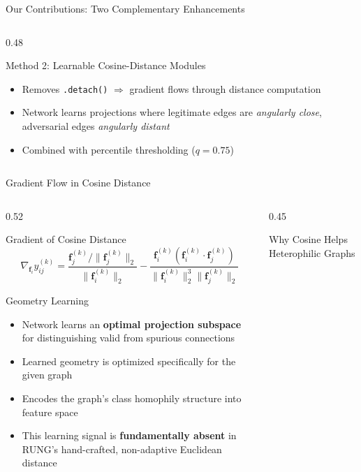 \documentclass[aspectratio=169]{beamer}
\begin{document}
\begin{frame}{Our Contributions: Two Complementary Enhancements}
\begin{columns}[T]
\begin{column}{0.48\textwidth}
\begin{block}{Method 2: Learnable Cosine-Distance Modules}
\begin{itemize}
          \item Removes \texttt{.detach()} $\Rightarrow$ gradient flows through distance computation
          \item Network learns projections where legitimate edges are \emph{angularly close}, adversarial edges \emph{angularly distant}
          \item Combined with percentile thresholding ($q=0.75$)
        \end{itemize}
      \end{block}
    \end{column}
  \end{columns}
\end{frame}

\begin{frame}{Gradient Flow in Cosine Distance}
  \tiny
  \begin{columns}[T]
    \begin{column}{0.52\textwidth}
      \begin{block}{Gradient of Cosine Distance}
        \[
          \nabla_{\mathbf{f}_i} y^{(k)}_{ij} = \frac{\mathbf{f}^{(k)}_j / \|\mathbf{f}^{(k)}_j\|_2}{\|\mathbf{f}^{(k)}_i\|_2} - \frac{\mathbf{f}^{(k)}_i \left(\mathbf{f}^{(k)}_i \cdot \mathbf{f}^{(k)}_j\right)}{\|\mathbf{f}^{(k)}_i\|_2^3 \|\mathbf{f}^{(k)}_j\|_2}
        \]
      \end{block}
      \vspace{6pt}
      \begin{block}{Geometry Learning}
        \begin{itemize}
          \item Network learns an \textbf{optimal projection subspace} for distinguishing valid from spurious connections
          \item Learned geometry is optimized specifically for the given graph
          \item Encodes the graph's class homophily structure into feature space
          \item This learning signal is \textbf{fundamentally absent} in RUNG's hand-crafted, non-adaptive Euclidean distance
        \end{itemize}
      \end{block}
    \end{column}
    \begin{column}{0.45\textwidth}
      \begin{block}{Why Cosine Helps Heterophilic Graphs}
        \begin{itemize}

\end{itemize}
\end{block}
\end{column}
\end{columns}
\end{frame}
\end{document}
